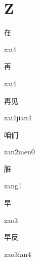 ﻿%
\section*{Z}

\begin{verbete}[zai4]{在}
\begin{pronuncia}{zai4}
\end{pronuncia}
\end{verbete}

\begin{verbete}[zai4]{再}
\begin{pronuncia}{zai4}
\end{pronuncia}
\end{verbete}

\begin{verbete}{再见}
\begin{pronuncia}{zai4jian4}
\end{pronuncia}
\end{verbete}

\begin{verbete}{咱们}
\begin{pronuncia}{zan2men0}
\end{pronuncia}
\end{verbete}

\begin{verbete}[zang1]{脏}
\begin{pronuncia}{zang1}
\end{pronuncia}
\end{verbete}

\begin{verbete}[zao3]{早}
\begin{pronuncia}{zao3}
\end{pronuncia}
\end{verbete}

\begin{verbete}{早反}
\begin{pronuncia}{zao3fan4}
\end{pronuncia}
\end{verbete}

